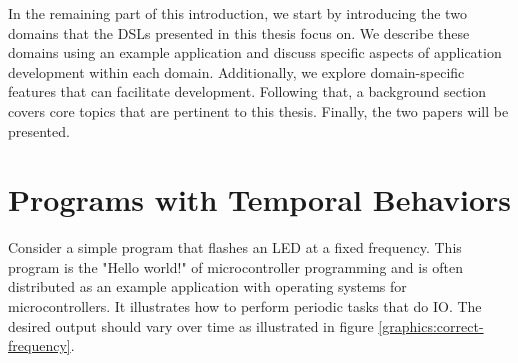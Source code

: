 In the remaining part of this introduction, we start by introducing the two domains that the DSLs presented in this thesis
focus on. We describe these domains using an example application and discuss specific aspects of application development
within each domain. Additionally, we explore domain-specific features that can facilitate development. Following that, a 
background section covers core topics that are pertinent to this thesis. Finally, the two papers will be presented.


\section{Programs with Temporal Behaviors}

Consider a simple program
that flashes an LED at a fixed frequency. This program is the "Hello world!" of microcontroller programming and is often distributed
as an example application with operating systems for microcontrollers. It illustrates how to perform
periodic tasks that do IO. The desired output should vary over time as illustrated in figure \ref{graphics:correct-frequency}.

